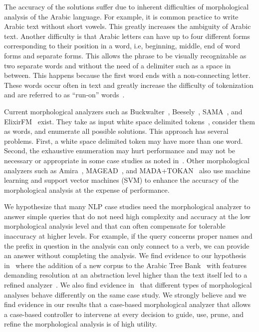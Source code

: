 \documentclass[11pt,letterpaper]{article}
\begin{document}
\novocalize
The accuracy of the solutions suffer due to inherent difficulties
of morphological analysis of the Arabic language. 
For example, it is common practice to write Arabic text
without short vowels. 
This greatly increases the ambiguity of Arabic text. 
Another difficulty is that  Arabic letters can have up to 
four different forms
corresponding to their position in a word, i.e, beginning,
middle, end of word forms and separate forms. 
This allows the phrase 
to be visually recognizable
as two separate words  and  without 
the need of a delimiter such as a space in between. 
This happens because the first word  ends with
 a non-connecting letter. 
These words occur often in text and greatly increase the
difficulty of tokenization and are referred to as 
``run-on'' words~\cite{Buckwalter:04}.

Current morphological analyzers such as 
Buckwalter~,
Beesely~, SAMA~\cite{Kulick:10},
and ElixirFM~\cite{Otakar:07} exist.
They take as input white space delimited tokens~\cite{Kulick:10},
consider them as words,
and enumerate all possible solutions. 
This approach has several problems. 
First, 
a white space delimited token may have 
more than one word.
Second, the exhaustive enumeration may hurt performance and may
not be necessary or appropriate
in some case studies as noted in~\cite{Maamouri:10}. 
Other morphological analyzers such as Amira~\cite{Diab:07,Benajiba:07},
MAGEAD~\cite{Habash:05}, and MADA+TOKAN~\cite{Habash:09} 
also use machine learning and support vector machines (SVM) 
to enhance the accuracy of the morphological analysis at the expense 
of performance.

We hypothesize that many NLP case studies need the 
morphological analyzer to answer simple queries that do not need 
high complexity and accuracy at the low morphological analysis level 
and that can often compensate for tolerable inaccuracy at higher levels. 
For example, if the query concerns proper names and the 
prefix in question in the analysis can only connect to a verb, 
we can provide an answer without completing the analysis. 
We find evidence to our hypothesis in~\cite{Maamouri:10} where the 
addition of a new corpus to the Arabic Tree Bank~\cite{Maamouri:04}
with features demanding resolution at an abstraction level
higher than the text itself
led to a refined analyzer~\cite{Kulick:10}.  
We also find evidence in~\cite{Habash:06} that different types of 
morphological analyses behave differently on the same case study. 
We strongly believe and we find evidence in our results that a 
case-based morphological analyzer that allows a case-based
controller to intervene at every decision to 
guide, use, prune, and refine the morphological analysis
is of high utility.
\end{document}
